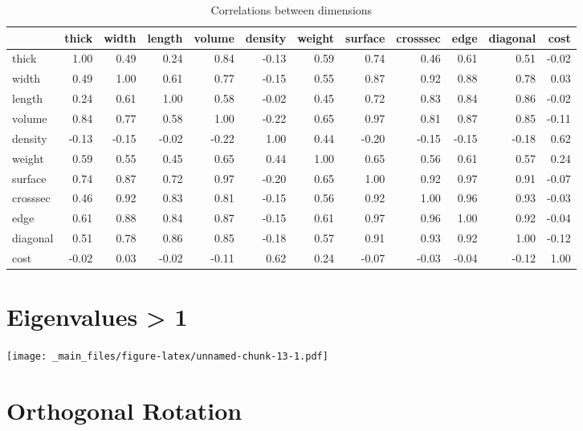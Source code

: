 \documentclass[
]{book}
\begin{document}
\tiny
\begin{table}

\caption{\label{tab:unnamed-chunk-12}Correlations between dimensions}
\centering
\begin{tabular}[t]{l|r|r|r|r|r|r|r|r|r|r|r}
\hline
  & thick & width & length & volume & density & weight & surface & crosssec & edge & diagonal & cost\\
\hline
thick & 1.00 & 0.49 & 0.24 & 0.84 & -0.13 & 0.59 & 0.74 & 0.46 & 0.61 & 0.51 & -0.02\\
\hline
width & 0.49 & 1.00 & 0.61 & 0.77 & -0.15 & 0.55 & 0.87 & 0.92 & 0.88 & 0.78 & 0.03\\
\hline
length & 0.24 & 0.61 & 1.00 & 0.58 & -0.02 & 0.45 & 0.72 & 0.83 & 0.84 & 0.86 & -0.02\\
\hline
volume & 0.84 & 0.77 & 0.58 & 1.00 & -0.22 & 0.65 & 0.97 & 0.81 & 0.87 & 0.85 & -0.11\\
\hline
density & -0.13 & -0.15 & -0.02 & -0.22 & 1.00 & 0.44 & -0.20 & -0.15 & -0.15 & -0.18 & 0.62\\
\hline
weight & 0.59 & 0.55 & 0.45 & 0.65 & 0.44 & 1.00 & 0.65 & 0.56 & 0.61 & 0.57 & 0.24\\
\hline
surface & 0.74 & 0.87 & 0.72 & 0.97 & -0.20 & 0.65 & 1.00 & 0.92 & 0.97 & 0.91 & -0.07\\
\hline
crosssec & 0.46 & 0.92 & 0.83 & 0.81 & -0.15 & 0.56 & 0.92 & 1.00 & 0.96 & 0.93 & -0.03\\
\hline
edge & 0.61 & 0.88 & 0.84 & 0.87 & -0.15 & 0.61 & 0.97 & 0.96 & 1.00 & 0.92 & -0.04\\
\hline
diagonal & 0.51 & 0.78 & 0.86 & 0.85 & -0.18 & 0.57 & 0.91 & 0.93 & 0.92 & 1.00 & -0.12\\
\hline
cost & -0.02 & 0.03 & -0.02 & -0.11 & 0.62 & 0.24 & -0.07 & -0.03 & -0.04 & -0.12 & 1.00\\
\hline
\end{tabular}
\end{table}

\hypertarget{eigenvalues-1}{%
\section{Eigenvalues \textgreater{} 1}\label{eigenvalues-1}}

\texttt{[image: \_main\_files/figure-latex/unnamed-chunk-13-1.pdf]}

\hypertarget{orthogonal-rotation-1}{%
\section{Orthogonal Rotation}\label{orthogonal-rotation-1}}
\end{document}
